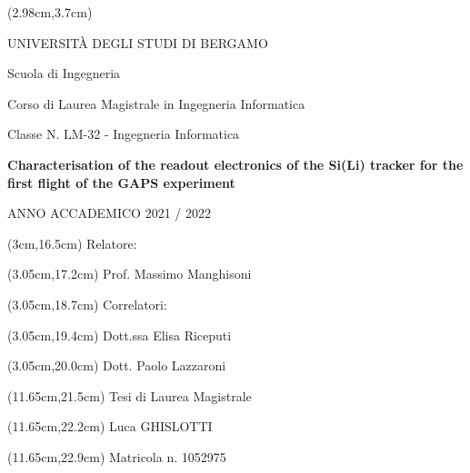 \thispagestyle{empty}
\begin{textblock*}{\textwidth}(2.98cm,3.7cm)
    \begin{center}
        \large
        UNIVERSITÀ DEGLI STUDI DI BERGAMO
    \end{center}
    \begin{center}
        Scuola di Ingegneria
    \end{center}
    \vspace{-0.5cm}
    \begin{center}
        Corso di Laurea Magistrale in Ingegneria Informatica
    \end{center}
    \vspace{-0.5cm}
    \begin{center}
        Classe N. LM-32 - Ingegneria Informatica
    \end{center}
    \vspace{2cm}
    \begin{center}
        \LARGE
        \textbf{Characterisation of the readout electronics of the Si(Li) tracker for the first flight of the GAPS experiment}
    \end{center}
    \vspace{12.5cm}
    \begin{center}
         ANNO ACCADEMICO 2021 / 2022
    \end{center}
\end{textblock*}

\begin{textblock*}{\textwidth}(3cm,16.5cm) 
    Relatore:
\end{textblock*}
\begin{textblock*}{\textwidth}(3.05cm,17.2cm)
    Prof. Massimo Manghisoni
\end{textblock*}

\begin{textblock*}{\textwidth}(3.05cm,18.7cm)
    Correlatori:
\end{textblock*}
\begin{textblock*}{\textwidth}(3.05cm,19.4cm)
    Dott.ssa Elisa Riceputi
\end{textblock*}
\begin{textblock*}{\textwidth}(3.05cm,20.0cm) 
    Dott. Paolo Lazzaroni
\end{textblock*}

\begin{textblock*}{\textwidth}(11.65cm,21.5cm)
    Tesi di Laurea Magistrale
\end{textblock*}
\begin{textblock*}{\textwidth}(11.65cm,22.2cm)
    Luca GHISLOTTI
\end{textblock*}
\begin{textblock*}{\textwidth}(11.65cm,22.9cm) 
    Matricola n. 1052975
\end{textblock*}